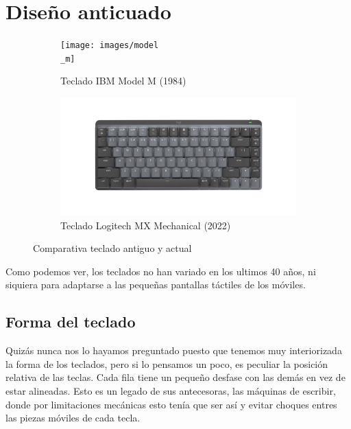 \section{Diseño anticuado}
  \begin{figure}[H]
    \begin{subfigure}[b]{.5\textwidth}
      \centering
      \texttt{[image: images/model\\\_m]}
      \caption{Teclado IBM Model M (1984)}
    \end{subfigure} 
    \hfill
    \begin{subfigure}[b]{.5\textwidth}
      \centering
      \includegraphics[width=\textwidth]{images/logitech}
      \caption{Teclado Logitech MX Mechanical (2022)}
    \end{subfigure}
    \caption{Comparativa teclado antiguo y actual}
  \end{figure}
  

  Como podemos ver, los teclados no han variado en los ultimos 40 años, ni siquiera para adaptarse a las pequeñas pantallas táctiles de los móviles.

  \subsection{Forma del teclado}
  Quizás nunca nos lo hayamos preguntado puesto que tenemos muy interiorizada la forma de los teclados, pero si lo pensamos un poco, es peculiar la posición relativa de las teclas. Cada fila tiene un pequeño desfase con las demás en vez de estar alineadas. Esto es un legado de sus antecesoras, las máquinas de escribir, donde por limitaciones mecánicas esto tenía que ser así y evitar choques entres las piezas móviles de cada tecla.

